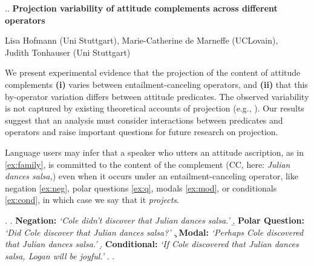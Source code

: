\documentclass[12pt, a4paper]{article}
\begin{document}

\enablehyphenation

\begin{center}
	\phantom.\vspace{-3\baselineskip}\phantom.\newline
	\textbf{\large%
		Projection variability of attitude complements across different operators}

	Lisa Hofmann (Uni Stuttgart), Marie-Catherine de Marneffe (UCLovain),\\Judith Tonhauser (Uni Stuttgart)
\end{center}

\vspace{-.8\baselineskip}
\noindent 
	We present experimental evidence that the projection of the content of attitude complements \textbf{(i)} varies between entailment-canceling operators, and \textbf{(ii)} that this by-operator variation differs between attitude predicates.
	The observed variability is not captured by existing theoretical accounts of projection
	(e.g., \citealt{heim_projection_1983,van_der_sandt_presupposition_1992,abrusan_predicting_2011,schlenker_triggering_2021}).
	Our results suggest that an analysis must consider interactions between predicates and operators and raise important questions for future research on projection.

	Language users may infer that a speaker who utters an attitude ascription, as in \ref{ex:family}, is committed to the content of the complement (CC, here: \emph{Julian dances salsa,})
	even when it occurs under an entailment-canceling operator, like negation \ref{ex:neg}, polar questions \ref{ex:q}, modals \ref{ex:mod}, or conditionals \ref{ex:cond}, in which case we say that it \emph{projects}.

	\vspace{-.5\baselineskip}
	\ex. \label{ex:family}
		\a. \label{ex:neg}
			{\bf Negation:} \hfill
			\emph{\lq Cole didn't discover that Julian dances salsa.\rq}
		\b. \label{ex:q}
			{\bf Polar Question:} \hfill
			\emph{\lq Did Cole discover that Julian dances salsa?\rq}
		\c. \label{ex:mod}
			{\bf Modal:} \hfill
			\emph{\lq Perhaps Cole discovered that Julian dances salsa.\rq}
		\d. \label{ex:cond}
			{\bf Conditional:} \hfill
			\emph{\lq If Cole discovered that Julian dances salsa, Logan will be joyful.\rq}
		\z.
	\z.
	
\end{document}
